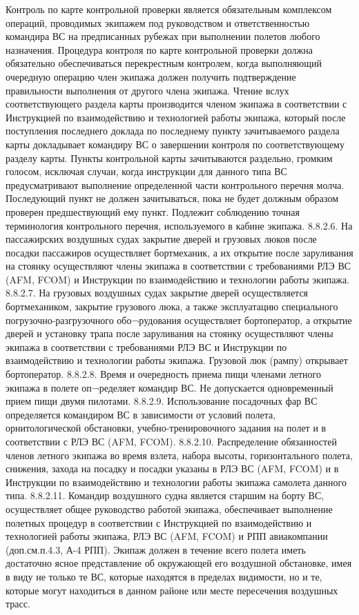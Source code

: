 Контроль по карте контрольной проверки является обязательным комплексом операций, проводимых экипажем под руководством и ответственностью командира ВС на предписанных рубежах при выполнении полетов любого назначения. Процедура контроля по карте контрольной проверки должна обязательно обеспечиваться перекрестным контролем, когда выполняющий очередную операцию член экипажа должен получить подтверждение правильности выполнения от другого члена экипажа.
Чтение вслух соответствующего раздела карты производится членом экипажа в соответствии с Инструкцией по взаимодействию и технологией работы экипажа, который после поступления последнего доклада по последнему пункту зачитываемого раздела карты докладывает командиру ВС о завершении контроля по соответствующему разделу карты.
Пункты контрольной карты зачитываются раздельно, громким голосом, исключая случаи, когда инструкции для данного типа ВС предусматривают выполнение определенной части контрольного перечня молча. 
Последующий пункт не должен зачитываться, пока не будет должным образом проверен предшествующий ему пункт. Подлежит соблюдению точная терминология контрольного перечня, используемого в кабине экипажа.
8.8.2.6. На пассажирских воздушных судах закрытие дверей и грузовых люков после посадки пассажиров осуществляет бортмеханик, а их открытие после заруливания на стоянку осуществляют члены экипажа в соответствии с требованиями РЛЭ ВС (AFM, FCOM) и Инструкции по взаимодействию и технологии работы экипажа.
8.8.2.7. На грузовых воздушных судах закрытие дверей осуществляется бортмехаником, закрытие грузового люка, а также эксплуатацию специального погрузочно-разгрузочного обо¬рудования осуществляет бортоператор, а открытие дверей и установку трапа после заруливания на стоянку осуществляют члены экипажа в соответствии с требованиями РЛЭ ВС и Инструкции по взаимодействию и технологии работы экипажа. Грузовой люк (рампу) открывает бортоператор.
8.8.2.8. Время и очередность приема пищи членами летного экипажа в полете оп¬ределяет командир ВС. Не допускается одновременный прием пищи двумя пилотами.
8.8.2.9. Использование посадочных фар ВС определяется командиром ВС в зависимости от условий полета, орнитологической обстановки, учебно-тренировочного задания на полет и в соответствии с РЛЭ ВС (AFM, FCOM).
8.8.2.10. Распределение обязанностей членов летного экипажа во время взлета, набора высоты, горизонтального полета, снижения, захода на посадку и посадки указаны в РЛЭ ВС (AFM, FCOM) и в Инструкции по взаимодействию и технологии работы экипажа самолета данного типа. 
8.8.2.11. Командир воздушного судна является старшим на борту ВС, осуществляет общее руководство работой экипажа, обеспечивает выполнение полетных процедур в соответствии с Инструкцией по взаимодействию и технологией работы экипажа, РЛЭ ВС (AFM, FCOM) и РПП авиакомпании (доп.см.п.4.3, А-4 РПП). Экипаж должен в течение всего полета иметь достаточно ясное представление об окружающей его воздушной обстановке, имея в виду не только те ВС, которые находятся в пределах видимости, но и те, которые могут находиться в данном районе или месте пересечения воздушных трасс.
